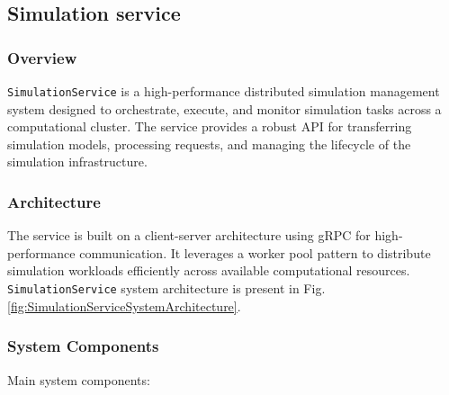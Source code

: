 \subsection{Simulation service}
\subsubsection{Overview}

\texttt{SimulationService} is a high-performance distributed simulation management system designed to orchestrate, execute, and monitor simulation tasks across a computational cluster. The service provides a robust API for transferring simulation models, processing requests, and managing the lifecycle of the simulation infrastructure.

\subsubsection{Architecture}

The service is built on a client-server architecture using gRPC for high-performance communication. It leverages a worker pool pattern to distribute simulation workloads efficiently across available computational resources. \texttt{SimulationService} system architecture is present in Fig. \ref{fig:SimulationServiceSystemArchitecture}.

\subsubsection{System Components}

Main system components:

